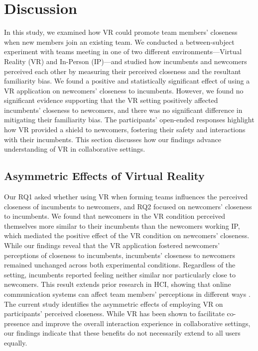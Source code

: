 \section{Discussion}
\label{discussion}
In this study, we examined how VR could promote team members' closeness when new members join an existing team. We conducted a between-subject experiment with teams meeting in one of two different environments---Virtual Reality (VR) and In-Person (IP)---and studied how incumbents and newcomers perceived each other by measuring their perceived closeness and the resultant familiarity bias. We found a positive and statistically significant effect of using a VR application on newcomers' closeness to incumbents. However, we found no significant evidence supporting that the VR setting positively affected incumbents' closeness to newcomers, and there was no significant difference in mitigating their familiarity bias. The participants' open-ended responses highlight how VR provided a shield to newcomers, fostering their safety and interactions with their incumbents. This section discusses how our findings advance understanding of VR in collaborative settings.

\subsection{Asymmetric Effects of Virtual Reality}
Our RQ1 asked whether using VR when forming teams influences the perceived closeness of incumbents to newcomers, and RQ2 focused on newcomers' closeness to incumbents. We found that newcomers in the VR condition perceived themselves more similar to their incumbents than the newcomers working IP, which mediated the positive effect of the VR condition on newcomers' closeness. While our findings reveal that the VR application fostered newcomers' perceptions of closeness to incumbents, incumbents' closeness to newcomers remained unchanged across both experimental conditions. Regardless of the setting, incumbents reported feeling neither similar nor particularly close to newcomers. This result extends prior research in HCI, showing that online communication systems can affect team members' perceptions in different ways \cite{yee2007proteus}. The current study identifies the asymmetric effects of employing VR on participants' perceived closeness. While VR has been shown to facilitate co-presence and improve the overall interaction experience in collaborative settings, our findings indicate that these benefits do not necessarily extend to all users equally.

